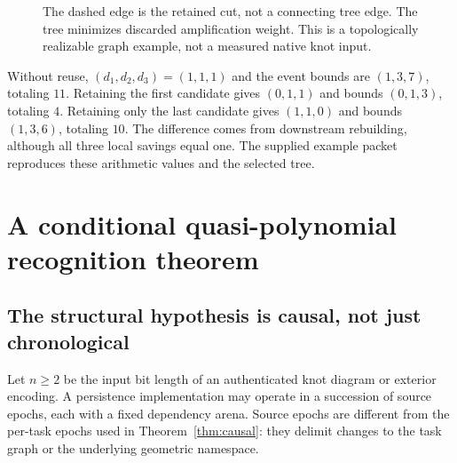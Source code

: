 \documentclass[11pt]{article}
\theoremstyle{definition}
\begin{document}
\begin{figure}[ht]
\centering
{}
\caption{The dashed edge is the retained cut, not a connecting tree edge. The tree minimizes discarded amplification weight. This is a topologically realizable graph example, not a measured native knot input.}\label{fig:triangle}
\end{figure}
Without reuse, $(d_1,d_2,d_3)=(1,1,1)$ and the event bounds are $(1,3,7)$, totaling $11$. Retaining the first candidate gives $(0,1,1)$ and bounds $(0,1,3)$, totaling $4$. Retaining only the last candidate gives $(1,1,0)$ and bounds $(1,3,6)$, totaling $10$. The difference comes from downstream rebuilding, although all three local savings equal one. The supplied example packet reproduces these arithmetic values and the selected tree.

\section{A conditional quasi-polynomial recognition theorem}\label{sec:qp}
\subsection{The structural hypothesis is causal, not just chronological}
Let $n\geq2$ be the input bit length of an authenticated knot diagram or exterior encoding. A persistence implementation may operate in a succession of source epochs, each with a fixed dependency arena. Source epochs are different from the per-task epochs used in Theorem~\ref{thm:causal}: they delimit changes to the task graph or the underlying geometric namespace.
\end{document}

